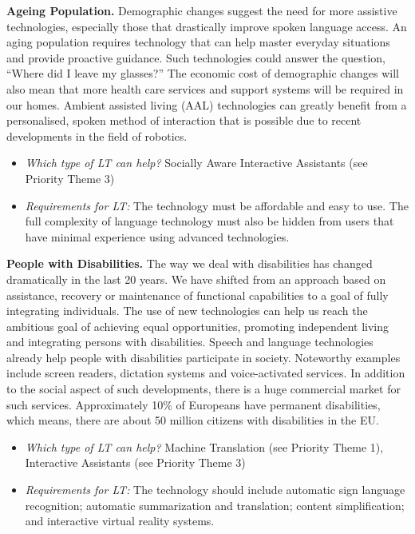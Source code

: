 \documentclass[10pt, plain]{../../metanetpaper}
\begin{document}
\begin{multicols}{2}
\textbf{Ageing Population.} Demographic changes suggest the need for more assistive technologies, especially those that drastically improve spoken language access. An aging population requires technology that can help master everyday situations and provide proactive guidance. Such technologies could answer the question, “Where did I leave my glasses?” The economic cost of demographic changes will also mean that more health care services and support systems will be required in our homes. Ambient assisted living (AAL) technologies can greatly benefit from a personalised, spoken method of interaction that is possible due to recent developments in the field of robotics. 

\begin{itemize}
\item \emph{Which type of LT can help?} Socially Aware Interactive Assistants (see Priority Theme 3)
\item \emph{Requirements for LT:} The technology must be affordable and easy to use. The full complexity of language technology must also be hidden from users that have minimal experience using advanced technologies.
\end{itemize}

\textbf{People with Disabilities.} The way we deal with disabilities has changed dramatically in the last 20 years. We have shifted from an approach based on assistance, recovery or maintenance of functional capabilities to a goal of fully integrating individuals. The use of new technologies can help us reach the ambitious goal of achieving equal opportunities, promoting independent living and integrating persons with disabilities. Speech and language technologies already help people with disabilities participate in society. Noteworthy examples include screen readers, dictation systems and voice-activated services. In addition to the social aspect of such developments, there is a huge commercial market for such services. Approximately 10\% of Europeans have permanent disabilities, which means, there are about 50 million citizens with disabilities in the EU.

\begin{itemize}
\item \emph{Which type of LT can help?} Machine Translation (see Priority Theme 1), Interactive Assistants (see Priority Theme 3)
\item \emph{Requirements for LT:} The technology should include automatic sign language recognition; automatic summarization and translation; content simplification; and interactive virtual reality systems.
\end{itemize}


\end{multicols}
\end{document}
